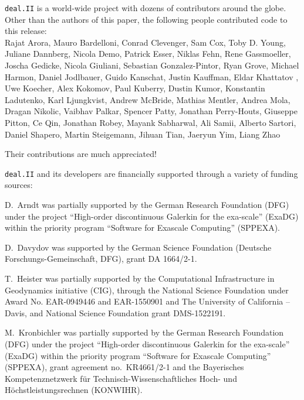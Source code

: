 \documentclass{ansarticle-preprint}
\newcommand{\specialword}[1]{\texttt{#1}}
\newcommand{\dealii}{{\specialword{deal.II}}}
\begin{document}
\dealii{} is a world-wide project with dozens of contributors around the
globe. Other than the authors of this paper, the following people contributed code to
this release:\\
%
%
  Rajat Arora,
  Mauro Bardelloni,
  Conrad Clevenger,
  Sam Cox,
  Toby D. Young,
  Juliane Dannberg,
  Nicola Demo,
  Patrick Esser,
  Niklas Fehn,
  Rene Gassmoeller,
  Joscha Gedicke,
  Nicola Giuliani,
  Sebastian Gonzalez-Pintor,
  Ryan Grove,
  Michael Harmon,
  Daniel Jodlbauer,
  Guido Kanschat,
  Justin Kauffman,
  Eldar Khattatov ,
  Uwe Koecher,
  Alex Kokomov,
  Paul Kuberry,
  Dustin Kumor,
  Konstantin Ladutenko,
  Karl Ljungkvist,
  Andrew McBride,
  Mathias Mentler,
  Andrea Mola,
  Dragan Nikolic,
  Vaibhav Palkar,
  Spencer Patty,
  Jonathan Perry-Houts,
  Giuseppe Pitton,
  Ce Qin,
  Jonathan Robey,
  Mayank Sabharwal,
  Ali Samii,
  Alberto Sartori,
  Daniel Shapero,
  Martin Steigemann,
  Jihuan Tian,
  Jaeryun Yim,
  Liang Zhao


Their contributions are much appreciated!


\bigskip

\dealii{} and its developers are financially supported through a
variety of funding sources:

D.~Arndt was partially supported by the German Research Foundation (DFG) under the
project ``High-order discontinuous Galerkin for the exa-scale'' (ExaDG) within the
priority program ``Software for Exascale Computing'' (SPPEXA).

%
D.~Davydov was supported by the German Science Foundation
(Deutsche Forschungs-Gemeinschaft, DFG), grant DA 1664/2-1.

T.~Heister was partially supported by the Computational Infrastructure in
Geodynamics initiative (CIG), through the National Science Foundation
under Award No. EAR-0949446 and EAR-1550901 and The University of California -- Davis, and National Science Foundation grant DMS-1522191.

M.~Kronbichler was partially supported by the German Research Foundation (DFG)
under the project ``High-order discontinuous Galerkin for the exa-scale''
(ExaDG) within the priority program ``Software for Exascale Computing''
(SPPEXA), grant agreement no.~KR4661/2-1 and the Bayerisches Kompetenznetzwerk
f\"ur Technisch-Wissenschaftliches Hoch- und H\"ochstleistungsrechnen
(KONWIHR).
\end{document}
